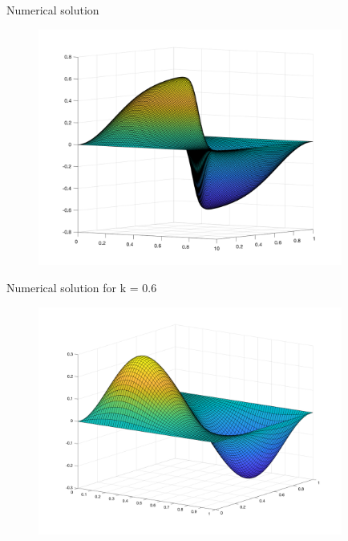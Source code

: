 \documentclass{beamer}
\begin{document}
    \begin{frame}{Numerical solution}
        \begin{figure}
            \includegraphics[width=10cm]{solution.png}
        \end{figure}
    \end{frame}

    \begin{frame}{Numerical solution for k = 0.6}
        \begin{figure}
            \includegraphics[width=10cm]{solution_constant_k.png}
        \end{figure}
    \end{frame}
\end{document}
